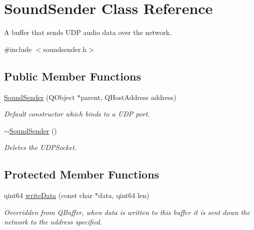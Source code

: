 \hypertarget{class_sound_sender}{
\section{\-Sound\-Sender \-Class \-Reference}
\label{class_sound_sender}
}


\-A buffer that sends \-U\-D\-P audio data over the network.  




{\ttfamily \#include $<$soundsender.\-h$>$}

\subsection*{\-Public \-Member \-Functions}
\begin{DoxyCompactItemize}
\item 
\hyperlink{class_sound_sender_a15a16cf2d16d1de5de0f0d0e4b4ce5c9}{\-Sound\-Sender} (\-Q\-Object $\ast$parent, \-Q\-Host\-Address address)
\begin{DoxyCompactList}\small\item\em \-Default constructor which binds to a \-U\-D\-P port. \end{DoxyCompactList}\item 
\hyperlink{class_sound_sender_a15f4c11ed7d489972876697b776b27ab}{$\sim$\-Sound\-Sender} ()
\begin{DoxyCompactList}\small\item\em \-Deletes the \-U\-D\-P\-Socket. \end{DoxyCompactList}\end{DoxyCompactItemize}
\subsection*{\-Protected \-Member \-Functions}
\begin{DoxyCompactItemize}
\item 
qint64 \hyperlink{class_sound_sender_a2557d162440651dcee73996162d4820a}{write\-Data} (const char $\ast$data, qint64 len)
\begin{DoxyCompactList}\small\item\em \-Overridden from \-Q\-Buffer, when data is written to this buffer it is sent down the network to the address specified. \end{DoxyCompactList}\end{DoxyCompactItemize}

